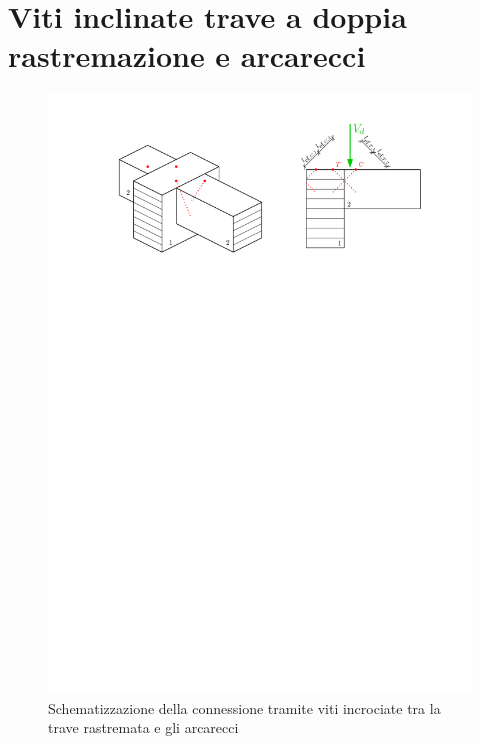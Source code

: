 \section{Viti inclinate trave a doppia rastremazione e arcarecci}
\begin{figure}[H]
    \centering
    \includegraphics[]{IMG/VitiIncrociate.pdf}
    \caption{Schematizzazione della connessione tramite viti incrociate tra la trave rastremata e gli arcarecci}
    \label{fig:VitiIncrociate}
\end{figure}
